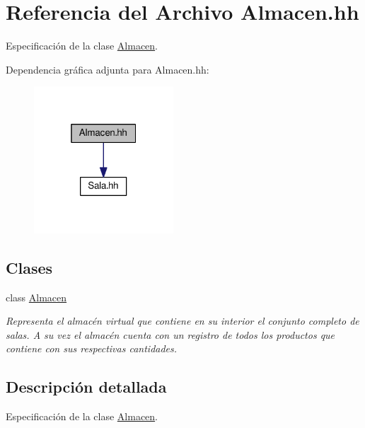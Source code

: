 \hypertarget{_almacen_8hh}{}\section{Referencia del Archivo Almacen.\+hh}
\label{_almacen_8hh}


Especificación de la clase \hyperlink{class_almacen}{Almacen}.  


Dependencia gráfica adjunta para Almacen.\+hh\+:\nopagebreak
\begin{figure}[H]
\begin{center}
\leavevmode
\includegraphics[width=148pt]{_almacen_8hh__incl}
\end{center}
\end{figure}
\subsection*{Clases}
\begin{DoxyCompactItemize}
\item 
class \hyperlink{class_almacen}{Almacen}
\begin{DoxyCompactList}\small\item\em Representa el almacén virtual que contiene en su interior el conjunto completo de salas. A su vez el almacén cuenta con un registro de todos los productos que contiene con sus respectivas cantidades. \end{DoxyCompactList}\end{DoxyCompactItemize}


\subsection{Descripción detallada}
Especificación de la clase \hyperlink{class_almacen}{Almacen}. 

